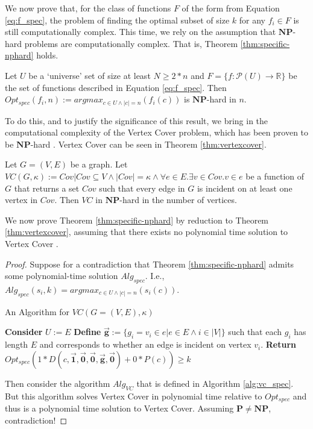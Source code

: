We now prove that, for the class of functions $F$ of the form from Equation \ref{eq:f_spec}, the problem of finding the optimal subset of size $k$ for any $f_i \in F$ is still computationally complex. This time, we rely on the assumption that $\mathbf{NP}$-hard problems are computationally complex. That is, Theorem \ref{thm:specific-nphard} holds. 

\begin{theorem}\label{thm:specific-nphard}
    Let $U$ be a `universe' set of size at least $N \geq 2*n$ and $F = \{f: \mathcal{P} (U) \rightarrow \mathbb{R}\}$ be the set of functions described in Equation \ref{eq:f_spec}. Then $Opt_{spec}(f_i, n) := argmax_{c \in U \land |c| = n}(f_i(c))$ is $\mathbf{NP}$-hard in $n$.
\end{theorem}

To do this, and to justify the significance of this result, we bring in the computational complexity of the Vertex Cover problem, which has been proven to be $\mathbf{NP}$-hard \cite{COPPERSMITH198527}. Vertex Cover can be seen in Theorem \ref{thm:vertexcover}.

\begin{theorem}\label{thm:vertexcover}
    Let $G = (V, E)$ be a graph. Let $VC(G, \kappa) := Cov | Cov \subseteq V \land |Cov| = \kappa \land \forall e \in E . \exists v \in Cov . v \in e$ be a function of $G$ that returns a set $Cov$ such that every edge in $G$ is incident on at least one vertex in $Cov$. Then $VC$ in $\mathbf{NP}$-hard in the number of vertices.
\end{theorem}

We now prove Theorem \ref{thm:specific-nphard} by reduction to Theorem \ref{thm:vertexcover}, assuming that there exists no polynomial time solution to Vertex Cover \cite{COPPERSMITH198527}.

\begin{proof}
Suppose for a contradiction that Theorem \ref{thm:specific-nphard} admits some polynomial-time solution $Alg_{spec}$. I.e., $Alg_{spec}(s_i, k )= argmax_{c \in U \land |c| = n}(s_i(c))$.

\begin{algorithm}
    \caption{An Algorithm for $VC(G = (V,E), \kappa)$}\label{alg:vc_spec}
    \begin{algorithmic}
        \State \textbf{Consider} $U := E$
        \State \textbf{Define} $\vec{\mathbf{g}} := \{g_i = v_i \in e | e \in E \land i \in |V|\}$ such that each $g_i$ has length $E$ and corresponds to whether an edge is incident on vertex $v_i$.
        \State \textbf{Return} $Opt_{spec}(1*D(c, \vec{\mathbf{1}}, \vec{\mathbf{0}}, \vec{\mathbf{0}}, \vec{\mathbf{g}}, \vec{\mathbf{0}})+ 0*P(c)) \geq k$
    \end{algorithmic}
\end{algorithm}

Then consider the algorithm $Alg_{VC}$ that is defined in Algorithm \ref{alg:vc_spec}. But this algorithm solves Vertex Cover in polynomial time relative to $Opt_{spec}$ and thus is a polynomial time solution to Vertex Cover. Assuming $\mathbf{P} \neq \mathbf{NP}$, contradiction!
\end{proof}

